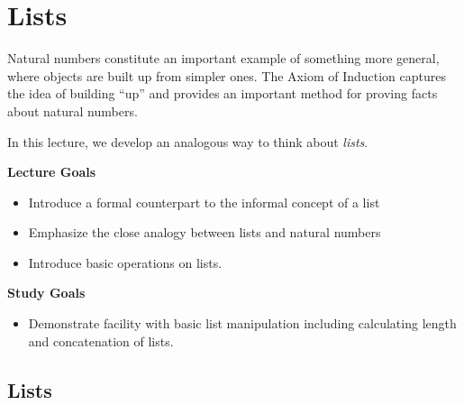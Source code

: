 \chapter{Lists}

Natural numbers constitute an important example of something more
general, where objects are built up from simpler
ones. The Axiom of Induction captures the idea of building ``up''
and provides an important method for proving facts about natural
numbers.

In this lecture, we develop an analogous way to think about \emph{lists}. 

\begin{goals}
\noindent \textbf{Lecture Goals}
\begin{itemize}
\item Introduce a formal counterpart to the informal concept of a list
\item Emphasize the close analogy between lists and natural numbers
\item Introduce basic operations on lists.
\end{itemize}

\noindent\textbf{Study Goals}
\begin{itemize}
\item Demonstrate facility with basic list manipulation including calculating length and 
concatenation of lists.
\end{itemize}
\end{goals}

\section{Lists}

